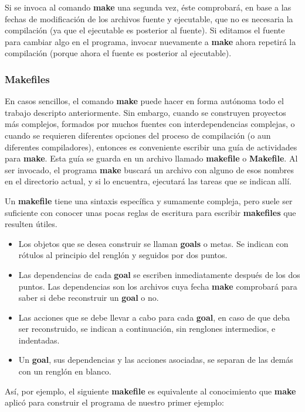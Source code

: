 Si se invoca al comando \textbf{make} una segunda vez, éste comprobará, en base a las fechas de
modificación de los archivos fuente y ejecutable, que no es necesaria la compilación (ya que el
ejecutable es posterior al fuente). Si editamos el fuente para cambiar algo en el programa, invocar
nuevamente a \textbf{make} ahora repetirá la compilación (porque ahora el fuente es posterior al ejecutable).


\subsubsection{Makefiles}
En casos sencillos, el comando \textbf{make} puede hacer en forma autónoma todo el trabajo descripto anteriormente. Sin embargo, cuando se construyen proyectos más complejos, formados por muchos fuentes con interdependencias complejas, o cuando se requieren diferentes opciones del proceso de compilación (o aun diferentes compiladores), entonces es conveniente escribir una guía de actividades para \textbf{make}. Esta guía se guarda en un archivo llamado \textbf{makefile} o \textbf{Makefile}. Al ser invocado, el programa \textbf{make} buscará un archivo con alguno de esos nombres en el directorio actual, y si lo encuentra, ejecutará las tareas que se indican allí.  

Un \textbf{makefile} tiene una sintaxis específica y sumamente compleja, pero suele ser suficiente con conocer unas pocas reglas de escritura para escribir \textbf{makefiles} que resulten útiles. 

\begin{itemize}
	\item Los objetos que se desea construir se llaman \textbf{goals} o metas. Se indican con rótulos al principio del renglón y seguidos por dos puntos.
	\item Las dependencias de cada \textbf{goal} se escriben inmediatamente después de los dos puntos. Las dependencias son los archivos cuya fecha \textbf{make} comprobará para saber si debe reconstruir un \textbf{goal} o no.
	\item Las acciones que se debe llevar a cabo para cada \textbf{goal}, en caso de que deba ser reconstruido, se indican a continuación, sin renglones intermedios, e indentadas.
	\item Un \textbf{goal}, sus dependencias y las acciones asociadas, se separan de las demás con un renglón en blanco.
\end{itemize}

Así, por ejemplo, el siguiente \textbf{makefile} es equivalente al conocimiento que \textbf{make} aplicó para construir el programa de nuestro primer ejemplo:

